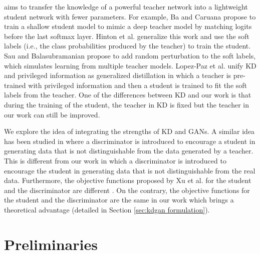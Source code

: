 \documentclass{article}
\begin{document}
 aims to transfer the knowledge of a powerful teacher network into a lightweight student network with fewer parameters.
For example, Ba and Caruana \cite{ba2014deep} propose to train a shallow student model to mimic a deep teacher model by matching logits before the last softmax layer.
Hinton et al. \cite{hinton2015distilling} generalize this work and use the soft labels (i.e., the class probabilities produced by the teacher) to train the student.
Sau and Balasubramanian \cite{sau2016deep} propose to add random perturbation to the soft labels, which simulates learning from multiple teacher models.
Lopez-Paz et al. \cite{lopez2015unifying} unify KD \cite{hinton2015distilling} and privileged information \cite{vapnik2015learning} as generalized distillation in which a teacher is pre-trained with privileged information and then a student is trained to fit the soft labels from the teacher.
One of the differences between KD and our work is that during the training of the student, the teacher in KD is fixed but the teacher in our work can still be improved.

We explore the idea of integrating the strengths of KD and GANs.
A similar idea has been studied in \cite{xu2017learning} where a discriminator is introduced to encourage a student in generating data that is not distinguishable from the data generated by a teacher.
This is different from our work in which a discriminator is introduced to encourage the student in generating data that is not distinguishable from the real data.
Furthermore, the objective functions proposed by Xu et al. for the student and the discriminator are different \cite{xu2017learning}.
On the contrary, the objective functions for the student and the discriminator are the same in our work which brings a theoretical advantage (detailed in Section \ref{sec:kdgan formulation}).


\section{Preliminaries}
\end{document}
